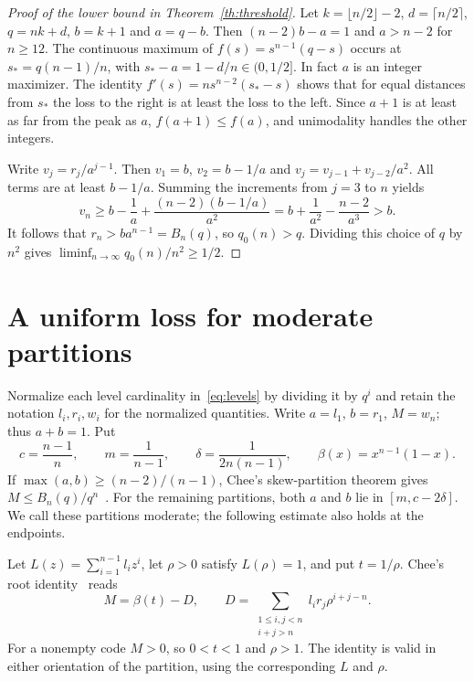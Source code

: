 \documentclass[11pt,a4paper]{article}
\newcommand{\floor}[1]{\lfloor #1\rfloor}
\newcommand{\ceil}[1]{\lceil #1\rceil}
\begin{document}
\begin{proof}[Proof of the lower bound in Theorem~\ref{th:threshold}]
Let $k=\floor{n/2}-2$, $d=\ceil{n/2}$, $q=nk+d$, $b=k+1$ and $a=q-b$. Then $(n-2)b-a=1$ and $a>n-2$ for $n\ge12$. The continuous maximum of $f(s)=s^{n-1}(q-s)$ occurs at $s_*=q(n-1)/n$, with $s_*-a=1-d/n\in(0,1/2]$. In fact $a$ is an integer maximizer. The identity $f'(s)=ns^{n-2}(s_*-s)$ shows that for equal distances from $s_*$ the loss to the right is at least the loss to the left. Since $a+1$ is at least as far from the peak as $a$, $f(a+1)\le f(a)$, and unimodality handles the other integers.

Write $v_j=r_j/a^{j-1}$. Then $v_1=b$, $v_2=b-1/a$ and $v_j=v_{j-1}+v_{j-2}/a^2$. All terms are at least $b-1/a$. Summing the increments from $j=3$ to $n$ yields
\[
 v_n\ge b-\frac1a+\frac{(n-2)(b-1/a)}{a^2}
     = b+\frac{1}{a^2}-\frac{n-2}{a^3}>b .
\]
It follows that $r_n>ba^{n-1}=B_n(q)$, so $q_0(n)>q$. Dividing this choice of $q$ by $n^2$ gives $\liminf_{n\to\infty} q_0(n)/n^2\ge1/2$.
\end{proof}

\section{A uniform loss for moderate partitions}

Normalize each level cardinality in~\eqref{eq:levels} by dividing it by $q^i$ and retain the notation $l_i,r_i,w_i$ for the normalized quantities. Write $a=l_1$, $b=r_1$, $M=w_n$; thus $a+b=1$. Put
\[
 c=\frac{n-1}{n},\qquad m=\frac{1}{n-1},\qquad
 \delta=\frac{1}{2n(n-1)},\qquad \beta(x)=x^{n-1}(1-x).
\]
If $\max(a,b)\ge (n-2)/(n-1)$, Chee's skew-partition theorem gives $M\le B_n(q)/q^n$~\cite[Theorem~III.2]{Chee}. For the remaining partitions, both $a$ and $b$ lie in $[m,c-2\delta]$. We call these partitions moderate; the following estimate also holds at the endpoints.

Let $L(z)=\sum_{i=1}^{n-1} l_i z^i$, let $\rho>0$ satisfy $L(\rho)=1$, and put $t=1/\rho$. Chee's root identity~\cite[Lemma~II.5]{Chee} reads
\begin{equation}\label{eq:root}
 M=\beta(t)-D,\qquad
 D=\sum_{\substack{1\le i,j<n\\i+j>n}} l_i r_j\rho^{i+j-n}.
\end{equation}
For a nonempty code $M>0$, so $0<t<1$ and $\rho>1$. The identity is valid in either orientation of the partition, using the corresponding $L$ and $\rho$.
\end{document}

